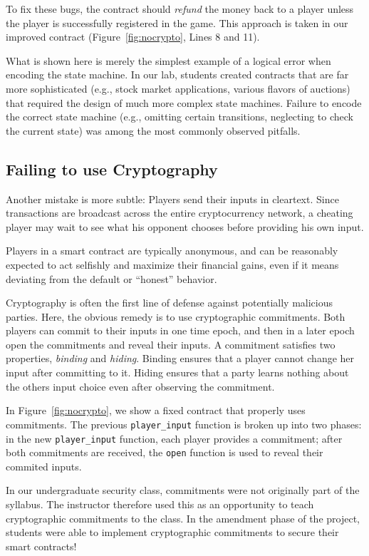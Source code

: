 \documentclass[10pt,twocolumn,letterpaper]{article}
\newcommand{\elaine}[1]{{\color{red}{[elaine: #1]}}}
\begin{document}
To fix these bugs, the contract
should \emph{refund} the money back to
a player unless the player is successfully registered in the game.
This approach is taken in our improved contract (Figure~\ref{fig:nocrypto}, Lines 8 and 11).


What is shown here is merely the simplest example 
of a logical error when encoding the state machine.
In our lab, students created contracts that are far more
sophisticated (e.g., stock market 
applications, various flavors of auctions)
that required the design of much more 
complex state machines.
Failure to encode the correct state machine (e.g., 
omitting certain transitions, neglecting
to check the current state)  
was among the most commonly observed pitfalls. 


\subsection{Failing to use Cryptography}
Another mistake is more subtle:
Players
send their inputs in cleartext. Since transactions are broadcast across the entire cryptocurrency network, a cheating player may wait to see what his opponent chooses before providing his own input.

Players in a smart contract are typically anonymous, and can be reasonably expected to act selfishly and maximize their financial gains, even if it means deviating from the default or ``honest'' behavior.

Cryptography is often the first line of defense against potentially malicious parties. 
Here, the obvious remedy is to use
cryptographic commitments.
Both players can commit to their inputs in one time epoch,
and then in a later epoch open the commitments and reveal their inputs.
A commitment satisfies two properties, {\it binding} and {\it hiding}.
Binding ensures that a player cannot change her input
after committing to it. Hiding ensures
that a party learns nothing about the others input choice even after observing the commitment.

In Figure~\ref{fig:nocrypto}, we show a fixed contract that properly uses commitments. The previous \texttt{player\_input} function is broken up into two phases: in the new \texttt{player\_input} function, each player provides a commitment; after both commitments are received, the \texttt{open} function is used to reveal their commited inputs.

In our undergraduate security class, commitments were not originally 
part of the syllabus. The instructor
therefore used this as an opportunity to teach cryptographic commitments
to the class.
In the amendment phase of the project,
students were able to implement cryptographic commitments
to secure their smart contracts!
\end{document}
